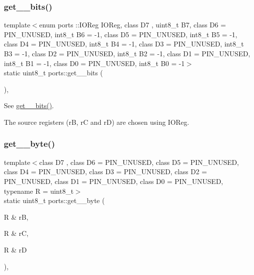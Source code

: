 \subsubsection{\texorpdfstring{get\+\_\+\_\+bits()}{get\_8\_bits()}\hspace{0.1cm}{\footnotesize\ttfamily [2/2]}}
{\footnotesize\ttfamily template$<$enum ports \+::\+I\+O\+Reg I\+O\+Reg, class D7 , uint8\+\_\+t B7, class D6  = P\+I\+N\+\_\+\+U\+N\+U\+S\+ED, int8\+\_\+t B6 = -\/1, class D5  = P\+I\+N\+\_\+\+U\+N\+U\+S\+ED, int8\+\_\+t B5 = -\/1, class D4  = P\+I\+N\+\_\+\+U\+N\+U\+S\+ED, int8\+\_\+t B4 = -\/1, class D3  = P\+I\+N\+\_\+\+U\+N\+U\+S\+ED, int8\+\_\+t B3 = -\/1, class D2  = P\+I\+N\+\_\+\+U\+N\+U\+S\+ED, int8\+\_\+t B2 = -\/1, class D1  = P\+I\+N\+\_\+\+U\+N\+U\+S\+ED, int8\+\_\+t B1 = -\/1, class D0  = P\+I\+N\+\_\+\+U\+N\+U\+S\+ED, int8\+\_\+t B0 = -\/1$>$ \\
static uint8\+\_\+t ports\+::get\+\_\+\_\+bits (\begin{DoxyParamCaption}{ }\end{DoxyParamCaption})\hspace{0.3cm}{\ttfamily [inline]}, {\ttfamily [static]}}



See \hyperlink{namespaceports_a9a1959ec95780c00a964b174a27b2a37}{get\+\_\+\_\+bits()}. 

The source registers ({\ttfamily rB}, {\ttfamily rC} and {\ttfamily rD}) are chosen using I\+O\+Reg. \hypertarget{namespaceports_ae7d1ffc9ed6454ca61b006ffe43e4e6e}{}\label{namespaceports_ae7d1ffc9ed6454ca61b006ffe43e4e6e} 
\subsubsection{\texorpdfstring{get\+\_\+\_\+byte()}{get\_8\_byte()}\hspace{0.1cm}{\footnotesize\ttfamily [1/2]}}
{\footnotesize\ttfamily template$<$class D7 , class D6  = P\+I\+N\+\_\+\+U\+N\+U\+S\+ED, class D5  = P\+I\+N\+\_\+\+U\+N\+U\+S\+ED, class D4  = P\+I\+N\+\_\+\+U\+N\+U\+S\+ED, class D3  = P\+I\+N\+\_\+\+U\+N\+U\+S\+ED, class D2  = P\+I\+N\+\_\+\+U\+N\+U\+S\+ED, class D1  = P\+I\+N\+\_\+\+U\+N\+U\+S\+ED, class D0  = P\+I\+N\+\_\+\+U\+N\+U\+S\+ED, typename R  = uint8\+\_\+t$>$ \\
static uint8\+\_\+t ports\+::get\+\_\+\_\+byte (\begin{DoxyParamCaption}\item[{R \&}]{rB,  }\item[{R \&}]{rC,  }\item[{R \&}]{rD }\end{DoxyParamCaption})\hspace{0.3cm}{\ttfamily [inline]}, {\ttfamily [static]}}




